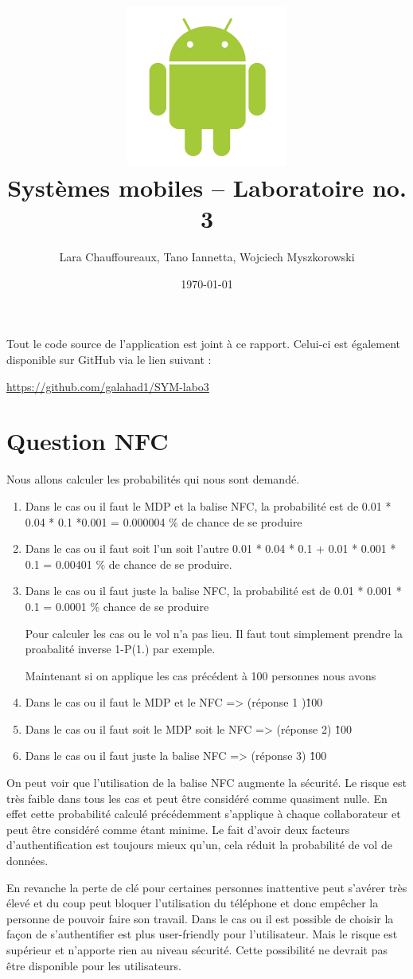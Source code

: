 \documentclass[12pt]{article}
\title{\includegraphics[width=200px]{title}\\
  \vspace{40 mm}
  \huge{Systèmes mobiles -- Laboratoire no. 3}
\vspace{20 mm}
}
\author{Lara Chauffoureaux, Tano Iannetta, Wojciech Myszkorowski}
\date{\today}
\begin{document}
\maketitle
\thispagestyle{empty}
\clearpage

Tout le code source de l'application est joint à ce rapport. Celui-ci est également disponible sur GitHub via le lien suivant : 

\url{https://github.com/galahad1/SYM-labo3}

\section*{Question NFC}
Nous allons calculer les probabilités qui nous sont demandé.
\begin{enumerate}
\item Dans le cas ou il faut le MDP et la balise NFC, la probabilité est de 0.01 * 0.04 * 0.1 *0.001 = 0.000004 \% de chance de se produire 
\item Dans le cas ou il faut soit l'un soit l'autre 0.01 * 0.04 * 0.1 + 0.01 * 0.001 * 0.1 = 0.00401 \% de chance de se produire.
\item Dans le cas ou il faut juste la balise NFC, la probabilité est de 0.01 * 0.001 * 0.1  = 0.0001 \% chance de se produire

Pour calculer les cas ou le vol n'a pas lieu. Il faut tout simplement prendre la proabalité inverse 1-P(1.) par exemple.

Maintenant si on applique les cas précédent à 100 personnes nous avons

\item Dans le cas ou il faut le MDP et le NFC => (réponse 1 )\^100
\item Dans le cas ou il faut soit le MDP soit le NFC => (réponse 2) \^100
\item Dans le cas ou il faut juste la balise NFC => (réponse 3) \^100
\end{enumerate}
On peut voir que l'utilisation de la balise NFC augmente la sécurité. Le risque est très faible dans tous les cas et peut être considéré comme quasiment nulle. En effet cette probabilité calculé précédemment s'applique à chaque collaborateur et peut être considéré comme étant minime. Le fait d'avoir deux facteurs d'authentification est toujours mieux qu'un, cela réduit la probabilité de vol de données.

En revanche la perte de clé pour certaines personnes inattentive peut s’avérer très élevé et du coup peut bloquer l'utilisation du téléphone et donc empêcher la personne de pouvoir faire son travail. Dans le cas ou il est possible de choisir la façon de s'authentifier est plus user-friendly pour l'utilisateur. Mais le risque est supérieur et n'apporte rien au niveau sécurité. Cette possibilité ne devrait pas être disponible pour les utilisateurs.
\end{document}
